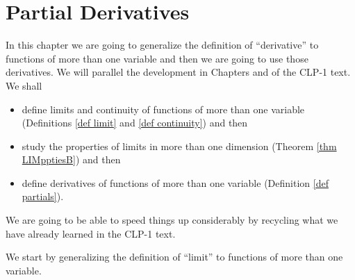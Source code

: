 
\def\eqf#1{{\buildrel \rm #1 \over =}}

\graphicspath{{figures/partials/}}
\chapter{Partial Derivatives}\label{chap partials}

In this chapter we are going to generalize the definition of
``derivative'' to functions of more than one variable and then we are 
going to use those derivatives. We will parallel the development
in Chapters  and 
of the CLP-1 text. We shall 
\begin{itemize}
\item
define limits and continuity of functions of more than one variable 
(Definitions \ref{def limit} and \ref{def continuity}) and then 

\item
study the properties of limits in more than one dimension
(Theorem \ref{thm LIMpptiesB}) and then 

\item
define derivatives of functions of more than one variable 
(Definition \ref{def partials}).

\end{itemize}
We are going to be able to speed things up considerably by recycling
what we have already learned in the CLP-1 text.

We start by generalizing the definition
of ``limit'' to functions of more than one variable.

